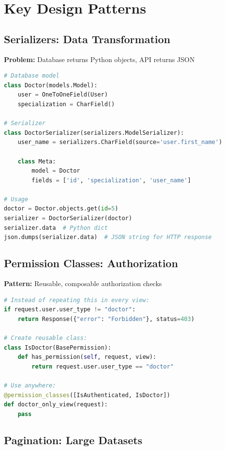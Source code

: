 \documentclass[11pt,a4paper,twoside]{report}
\begin{document}
\newpage

\chapter{Key Design Patterns}

\section{Serializers: Data Transformation}

\textbf{Problem:} Database returns Python objects, API returns JSON

\begin{lstlisting}[language=Python]
# Database model
class Doctor(models.Model):
    user = OneToOneField(User)
    specialization = CharField()

# Serializer
class DoctorSerializer(serializers.ModelSerializer):
    user_name = serializers.CharField(source='user.first_name')
    
    class Meta:
        model = Doctor
        fields = ['id', 'specialization', 'user_name']

# Usage
doctor = Doctor.objects.get(id=5)
serializer = DoctorSerializer(doctor)
serializer.data  # Python dict
json.dumps(serializer.data)  # JSON string for HTTP response
\end{lstlisting}

\section{Permission Classes: Authorization}

\textbf{Pattern:} Reusable, composable authorization checks

\begin{lstlisting}[language=Python]
# Instead of repeating this in every view:
if request.user.user_type != "doctor":
    return Response({"error": "Forbidden"}, status=403)

# Create reusable class:
class IsDoctor(BasePermission):
    def has_permission(self, request, view):
        return request.user.user_type == "doctor"

# Use anywhere:
@permission_classes([IsAuthenticated, IsDoctor])
def doctor_only_view(request):
    pass
\end{lstlisting}

\section{Pagination: Large Datasets}
\end{document}
